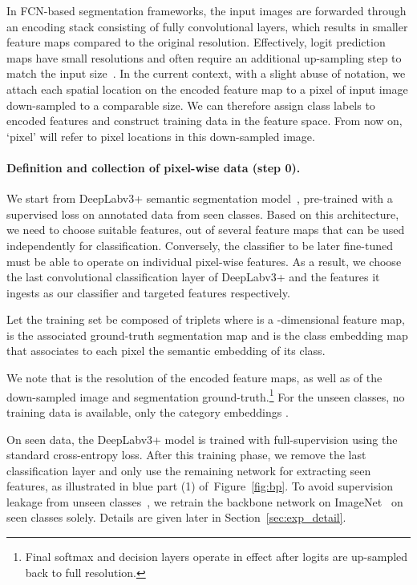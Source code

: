 \documentclass{article}
\begin{document}
In FCN-based segmentation frameworks, the input images are forwarded through an encoding stack consisting of fully convolutional layers, which results in smaller feature maps compared to the original resolution.
Effectively, logit prediction maps have small resolutions and often require an additional up-sampling step to match the input size~\cite{chen2017deeplab, chen2018encoder, long2015fully}.
In the current context, with a slight abuse of notation, we attach each spatial location on the encoded feature map to a pixel of input image down-sampled to a comparable size. We can therefore assign class labels to encoded features and construct training data in the feature space.
From now on, `pixel' will refer to pixel locations in this down-sampled image.

\vspace{-0.3cm}
\paragraph{Definition and collection of pixel-wise data (step 0).}
We start from DeepLabv3+ semantic segmentation model~\cite{chen2018encoder}, pre-trained with a supervised loss on annotated data from seen classes. 
Based on this architecture, we need to choose suitable features, out of several feature maps that can be used independently for classification.
Conversely, the classifier to be later fine-tuned must be able to operate on individual pixel-wise features.
As a result, we choose the last  convolutional classification layer of DeepLabv3+ and the features it ingests as our classifier  and targeted features  respectively.

Let the training set  be composed of triplets where  is 
a -dimensional feature map, 
 is the associated ground-truth
segmentation map and  is the class embedding map that associates to each pixel the semantic embedding of its class.

We note that  is the resolution of the encoded feature maps, as well as of the down-sampled image and segmentation ground-truth.\footnote{Final softmax and decision layers operate in effect after logits are up-sampled back to full resolution.}
For the  unseen classes, no training data is available, only the category embeddings .

On seen data, the DeepLabv3+ model is trained with full-supervision using the standard cross-entropy loss.
After this training phase, we remove the last classification layer and only use the remaining network for extracting seen features, as illustrated in blue part (1) of~Figure~\ref{fig:bp}.
To avoid supervision leakage from unseen classes~\cite{xian2018zero}, we retrain the backbone network on ImageNet~\cite{russakovsky2015imagenet} on seen classes solely.
Details are given later in Section~\ref{sec:exp_detail}.
\end{document}
